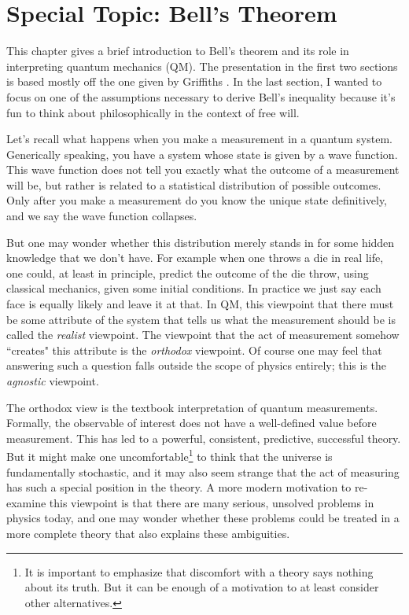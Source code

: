 \chapter{Special Topic: Bell's Theorem}\label{ap:bell}

This chapter gives a brief introduction to Bell's theorem and its role in
interpreting quantum mechanics (QM). The presentation in the first two sections
is based mostly off the one given by Griffiths 
\cite{griffiths_introduction_2005}. In the last section, I wanted to focus
on one of the assumptions necessary to derive Bell's inequality because
it's fun to think about philosophically in the context of free will.

Let's recall what happens when you make a measurement in a quantum system.
Generically speaking, you have a system whose state is given by a wave
function. This wave function does not tell you exactly what the
outcome of a measurement will be, but rather is related to a statistical
distribution of possible outcomes. Only after you make a measurement do
you know the unique state definitively, and we say the wave function collapses.

But one may wonder whether this distribution merely stands in for some
hidden knowledge that we don't have. For example when one throws a die
in real life, one could, at least in principle, predict the outcome of
the die throw, using classical mechanics, given some initial conditions.
In practice we just say each face is equally likely and leave it at that.
In QM, this viewpoint that there must be some attribute
of the system that tells us what the measurement should be is called
the {\it realist} viewpoint. The viewpoint that the act of measurement
somehow ``creates" this attribute is the {\it orthodox} viewpoint.
Of course one may feel that answering such a question falls outside the
scope of physics entirely; this is the {\it agnostic} viewpoint.

The orthodox view is the textbook interpretation of quantum
measurements. Formally, the observable of interest does not have a
well-defined value before measurement. This has led to a powerful,
consistent, predictive, successful theory. But it might make one 
uncomfortable\footnote{It is important to emphasize that discomfort
with a theory says nothing about its truth. But it can be enough of
a motivation to at least consider other alternatives.} to
think that the universe is fundamentally stochastic, and it
may also seem strange that the act of measuring has such a special
position in the theory. A more modern motivation to re-examine this
viewpoint is that there are many serious, unsolved problems in physics today,
and one may wonder whether these problems could be treated in a
more complete theory that also explains these ambiguities.

